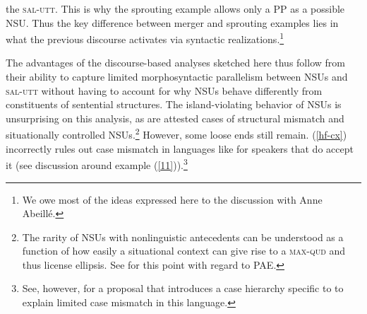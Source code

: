 the \textsc{sal-utt}. This is why the sprouting example allows only a PP as a possible NSU. Thus the key difference between
merger and sprouting examples lies in what the previous discourse
activates via syntactic realizations.\footnote{We owe most of the ideas expressed here to the discussion
with Anne Abeill\'{e}.}
%
%
%
%
%
%
%

The advantages of the discourse-based analyses sketched here thus follow from their ability to capture limited morphosyntactic parallelism between NSUs and \textsc{sal-utt} without having to account for why NSUs behave differently from constituents of sentential structures. The island-violating behavior of NSUs is unsurprising on this analysis, as are attested cases of structural mismatch and situationally controlled NSUs.\footnote{The rarity of NSUs with nonlinguistic antecedents can be understood as a function of how easily a situational context can give rise to a \textsc{max-qud} and thus license ellipsis. See \citet{Miller2014b} for this point with regard to PAE.}
However, some loose ends still remain. (\ref{hf-cx}) %
incorrectly rules out case mismatch in languages like  for speakers that do accept it (see discussion around example (\ref{11})).\footnote{See, however, \citet{Kim2015} for a proposal that introduces a case hierarchy specific to  to explain limited case mismatch in this language.}




